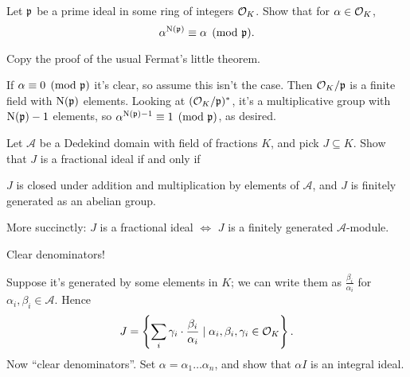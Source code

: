 \begin{problem}
	Let $\mathfrak p$ be a prime ideal in some ring of integers $\mathcal O_K$.
	Show that for $\alpha \in \mathcal O_K$,
	\[ \alpha^{\operatorname{N}(\mathfrak p)} \equiv \alpha \pmod{\mathfrak p}. \]
	\begin{hint}
		Copy the proof of the usual Fermat's little theorem.
	\end{hint}
	\begin{sol}
		If $\alpha \equiv 0 \pmod{\mathfrak p}$ it's clear, so assume this isn't the case.
		Then $\mathcal O_K/\mathfrak p$ is a finite field with $\operatorname{N}(\mathfrak p)$ elements.
		Looking at $(\mathcal O_K/\mathfrak p)^\ast$, it's a multiplicative group with $\operatorname{N}(\mathfrak p)-1$ elements,
		so $\alpha^{\operatorname{N}(\mathfrak p)-1} \equiv 1 \pmod{\mathfrak p}$, as desired.
	\end{sol}
\end{problem}

\begin{dproblem}
	Let $\mathcal A$ be a Dedekind domain with field of fractions $K$,
	and pick $J \subseteq K$.
	Show that $J$ is a fractional ideal if and only if
	\begin{enumerate}[(i)]
		\ii $J$ is closed under addition and multiplication
		by elements of $\mathcal A$, and
		\ii $J$ is finitely generated as an abelian group.
	\end{enumerate}
	More succinctly: $J$ is a fractional ideal $\iff$ $J$ is a finitely generated $\mathcal A$-module.
	\label{prob:fractional_ideal_alt_def}
	\begin{hint}
		Clear denominators!
	\end{hint}
	\begin{sol}
		Suppose it's generated by some elements in $K$; we can write them as
		$\frac{\beta_i}{\alpha_i}$ for $\alpha_i, \beta_i \in \mathcal A$.
		Hence
		\[ J = \left\{ \sum_i \gamma_i \cdot \frac{\beta_i}{\alpha_i}
		\mid \alpha_i, \beta_i, \gamma_i \in \mathcal O_K \right\}. \]
		Now ``clear denominators''. Set $\alpha = \alpha_1 \dots \alpha_n$,
		and show that $\alpha I$ is an integral ideal.
	\end{sol}
\end{dproblem}

